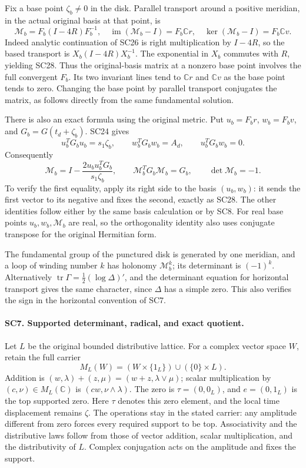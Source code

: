 Fix a base point \(\zeta_b\ne0\) in the disk. Parallel transport
around a positive meridian, in the actual original basis at
that point, is
\[
 \mathcal M_b
 =F_b(I-4R)F_b^{-1},\quad
 \operatorname{im}(\mathcal M_b-I)=F_b\mathbb Cr,\quad
 \ker(\mathcal M_b-I)=F_b\mathbb Cv.
 \tag{SC28}
\]
Indeed analytic continuation of SC26 is right multiplication by
\(I-4R\), so the based transport is \(X_b(I-4R)X_b^{-1}\).
The exponential in \(X_b\) commutes with \(R\), yielding SC28.
Thus the original-basis matrix at a nonzero base point involves
the full convergent \(F_b\). Its two invariant lines tend to
\(\mathbb Cr\) and \(\mathbb Cv\) as the base point tends to zero.
Changing the base point by parallel transport conjugates the
matrix, as follows directly from the same fundamental solution.

There is also an exact formula using the original metric.
Put \(u_b=F_br\), \(w_b=F_bv\), and \(G_b=G(t_d+\zeta_b)\).
SC24 gives
\[
 u_b^TG_bu_b=s_1\zeta_b,\qquad
 w_b^TG_bw_b=A_d,\qquad u_b^TG_bw_b=0.
\]
Consequently
\[
 \mathcal M_b
   =I-\frac{2u_bu_b^TG_b}{s_1\zeta_b},\qquad
 \mathcal M_b^TG_b\mathcal M_b=G_b,\qquad
 \det\mathcal M_b=-1 .
 \tag{SC29}
\]
To verify the first equality, apply its right side to the
basis \((u_b,w_b)\): it sends the first vector to its negative
and fixes the second, exactly as SC28. The other identities
follow either by the same basis calculation or by SC8.
For real base points \(u_b,w_b,\mathcal M_b\) are real, so the
orthogonality identity also uses conjugate transpose for the
original Hermitian form.

The fundamental group of the punctured disk is generated by
one meridian, and a loop of winding number \(k\) has holonomy
\(\mathcal M_b^k\); its determinant is \((-1)^k\).
Alternatively \(\operatorname{tr}\Gamma=
\frac12(\log\Delta)'\), and the determinant equation for
horizontal transport gives the same character, since \(\Delta\)
has a simple zero. This also verifies the sign in the
horizontal convention of SC7.

\paragraph{SC7. Supported determinant, radical, and exact quotient.}
Let \(L\) be the original bounded distributive lattice. For a
complex vector space \(W\), retain the full carrier
\[
 M_L(W)=(W\times\{1_L\})\cup(\{0\}\times L).
 \tag{SC30}
\]
Addition is \((w,\lambda)+(z,\mu)=(w+z,\lambda\vee\mu)\);
scalar multiplication by \((c,\nu)\in M_L(\mathbb C)\) is
\((cw,\nu\wedge\lambda)\). The zero is
\(\tau=(0,0_L)\), and \(e=(0,1_L)\) is the top supported
zero. Here \(\tau\) denotes this zero element, and the local
time displacement remains \(\zeta\).
The operations stay in the stated carrier: any amplitude
different from zero forces every required support to be top.
Associativity and the distributive laws follow from those of
vector addition, scalar multiplication, and the distributivity
of \(L\). Complex conjugation acts on the amplitude and fixes
the support.

